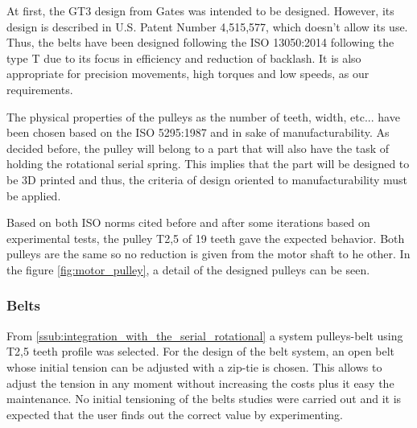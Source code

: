 At first, the GT3 design from Gates was intended to be designed.
However, its design is described in U.S. Patent Number 4,515,577, which doesn't allow its use.
Thus, the belts have been designed following the ISO 13050:2014 \cite{ISO13050} following the type T due to its focus in efficiency and reduction of backlash.
It is also appropriate for precision movements, high torques and low speeds, as our requirements.

The physical properties of the pulleys as the number of teeth, width, etc... have been chosen based on the ISO 5295:1987 \cite{ISO5295} and in sake of manufacturability.
As decided before, the pulley will belong to a part that will also have the task of holding the rotational serial spring.
This implies that the part will be designed to be 3D printed and thus, the criteria of design oriented to manufacturability must be applied.

Based on both ISO norms cited before and after some iterations based on experimental tests, the pulley T2,5 of 19 teeth gave the expected behavior.
Both pulleys are the same so no reduction is given from the motor shaft to he other.
In the figure \ref{fig:motor_pulley}, a detail of the designed pulleys can be seen.

\subsubsection{Belts} %
\label{ssub:belts}
From \ref{ssub:integration_with_the_serial_rotational} a system pulleys-belt using T2,5 teeth profile was selected.
For the design of the belt system, an open belt whose initial tension can be adjusted with a zip-tie is chosen.
This allows to adjust the tension in any moment without increasing the costs plus it easy the maintenance.
No initial tensioning of the belts studies were carried out and it is expected that the user finds out the correct value by experimenting.

